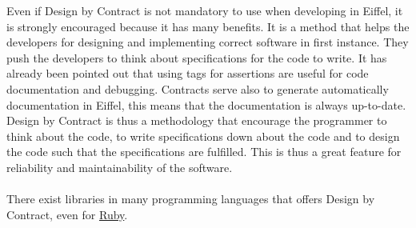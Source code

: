 \documentclass[12pt,a4paper,twocolumn]{article}
\begin{document}
Even if Design by Contract is not mandatory to use when developing in Eiffel, it is strongly encouraged because it has many benefits. It is a method that helps the developers for designing and implementing correct software in first instance. They push the developers to think about specifications for the code to write. It has already been pointed out that using tags for assertions are useful for code documentation and debugging. Contracts serve also to generate automatically documentation in Eiffel, this means that the documentation is always up-to-date. Design by Contract is thus a methodology that encourage the programmer to think about the code, to write specifications down about the code and to design the code such that the specifications are fulfilled. This is thus a great feature for reliability and maintainability of the software.
\\
\\
There exist libraries in many programming languages that offers Design by Contract, even for \href{https://github.com/egonSchiele/contracts.ruby}{Ruby}.
\end{document}
